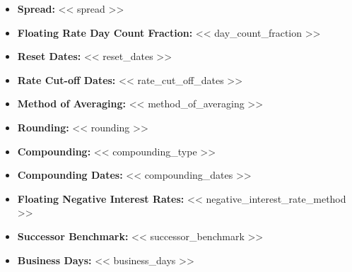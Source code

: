 \documentclass[11pt, a4paper]{article}
\newcommand{\templatetag}[1]{} %
\begin{document}
\begin{itemize}[leftmargin=2cm, label={}, itemsep=1pt]
    \item \textbf{Spread:} << spread >>
    \item \textbf{Floating Rate Day Count Fraction:} << day_count_fraction >>
    \item \textbf{Reset Dates:} << reset_dates >>
\templatetag{<<- if rate_cut_off_dates >>}
    \item \textbf{Rate Cut-off Dates:} << rate_cut_off_dates >>
\templatetag{<<- endif >>}
\templatetag{<<- if method_of_averaging >>}
    \item \textbf{Method of Averaging:} << method_of_averaging >>
\templatetag{<<- endif >>}
    \item \textbf{Rounding:} << rounding >>

\templatetag{<<- if model_type == 'I' and compounding_applicable >>}
    \item \textbf{Compounding:} << compounding_type >>
    \item \textbf{Compounding Dates:} << compounding_dates >>
\templatetag{<<- endif >>}

    \item \textbf{Floating Negative Interest Rates:} << negative_interest_rate_method >>
\templatetag{<<- if successor_benchmark >>}
    \item \textbf{Successor Benchmark:} << successor_benchmark >>
\templatetag{<<- endif >>}
\templatetag{<<- if business_days >>}
    \item \textbf{Business Days:} << business_days >>
\templatetag{<<- endif >>}
\end{itemize}

\templatetag{<<- if model_type == 'II' >>}
\end{document}
